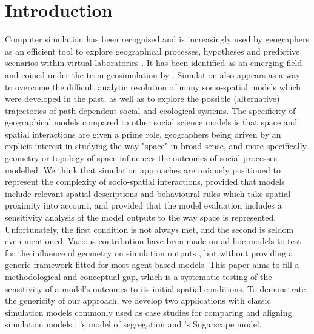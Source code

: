 \documentclass{JASSS}
\begin{document}
\parano{}



%




\section{Introduction}

Computer simulation has been recognised and is increasingly used by geographers as an efficient tool to explore geographical processes, hypotheses and predictive scenarios within virtual laboratories \citep{batty1971modelling, batty2007model, carley1999generating, Quesneletal2009}. It has been identified as an emerging field and coined under the term geosimulation by \cite{benenson2004geosimulation}. Simulation also appears as a way to overcome the difficult analytic resolution of many socio-spatial models which were developed in the past, as well as to explore the possible (alternative) trajectories of path-dependent social and ecological systems. The specificity of geographical models compared to other social science models is that space and spatial interactions are given a prime role, geographers being driven by an explicit interest in studying the way "space" in broad sense, and more specifically geometry or topology of space influences the outcomes of social processes modelled. We think that simulation approaches are uniquely positioned to represent the complexity of socio-spatial interactions, provided that models include relevant spatial descriptions and behavioural rules which take spatial proximity into account, and provided that the model evaluation includes a sensitivity analysis of the model outputs to the way space is represented. Unfortunately, the first condition is not always met, and the second is seldom even mentioned. Various contribution have been made on ad hoc models to test for the influence of geometry on simulation outputs \citep{lilburne2009sensitivity, sun2007traffic}, but without providing a generic framework fitted for most agent-based models. This paper aims to fill a methodological and conceptual gap, which is a systematic testing of the sensitivity of a model's outcomes to its initial spatial conditions. To demonstrate the genericity of our approach, we develop two applications with classic simulation models commonly used as case studies for comparing and aligning simulation models \citep{Axtelletal1996, wilensky2007making}: \citet{schelling1971dynamic}'s model of segregation and \citet{EpsteinAxtell1996}'s Sugarscape model.\\
\end{document}
